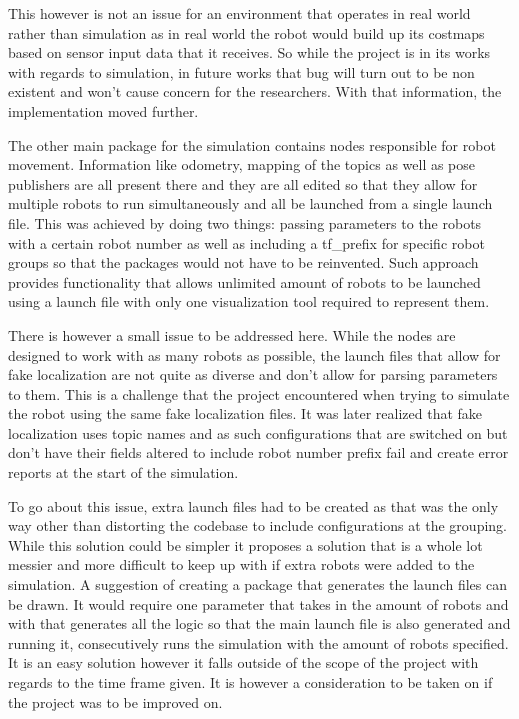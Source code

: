       This however is not an issue for an environment that operates in real world rather than simulation as in real world the robot would build up its costmaps based on sensor input data that it receives. So while the project is in its works with regards to simulation, in future works that bug will turn out to be non existent and won't cause concern for the researchers. With that information, the implementation moved further.

      The other main package for the simulation contains nodes responsible for robot movement. Information like odometry, mapping of the topics as well as pose publishers are all present there and they are all edited so that they allow for multiple robots to run simultaneously and all be launched from a single launch file. This was achieved by doing two things: passing parameters to the robots with a certain robot number as well as including a tf\_prefix for specific robot groups so that the packages would not have to be reinvented. Such approach provides functionality that allows unlimited amount of robots to be launched using a launch file with only one visualization tool required to represent them.

      There is however a small issue to be addressed here. While the nodes are designed to work with as many robots as possible, the launch files that allow for fake localization are not quite as diverse and don't allow for parsing parameters to them. This is a challenge that the project encountered when trying to simulate the robot using the same fake localization files. It was later realized that fake localization uses topic names and as such configurations that are switched on but don't have their fields altered to include robot number prefix fail and create error reports at the start of the simulation.

      To go about this issue, extra launch files had to be created as that was the only way other than distorting the codebase to include configurations at the grouping. While this solution could be simpler it proposes a solution that is a whole lot messier and more difficult to keep up with if extra robots were added to the simulation. A suggestion of creating a package that generates the launch files can be drawn. It would require one parameter that takes in the amount of robots and with that generates all the logic so that the main launch file is also generated and running it, consecutively runs the simulation with the amount of robots specified. It is an easy solution however it falls outside of the scope of the project with regards to the time frame given. It is however a consideration to be taken on if the project was to be improved on.

